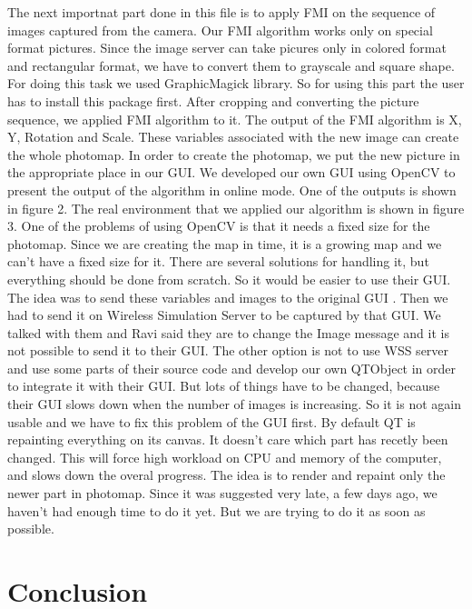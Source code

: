 \documentclass{article}
\begin{document}
The next importnat part done in this file is to apply FMI on the sequence of images captured from the camera. Our FMI algorithm works only on special format pictures. Since the image server can take picures only in colored format and rectangular format, we have to convert them to grayscale and square shape. For doing this task we used GraphicMagick library. So for using this part the user has to install this package first. After cropping and converting the picture sequence, we applied FMI algorithm to it. The output of the FMI algorithm is X, Y, Rotation and Scale. These variables associated with the new image can create the whole photomap. In order to create the photomap, we put the new picture in the appropriate place in our GUI. We developed our own GUI using OpenCV to present the output of the algorithm in online mode. One of the outputs is shown in figure 2. The real environment that we applied our algorithm is shown in figure 3. One of the problems of using OpenCV is that it needs a fixed size for the photomap. Since we are creating the map in time, it is a growing map and we can't have a fixed size for it. There are several solutions for handling it, but everything should be done from scratch. So it would be easier to use their GUI.\\

The idea was to send these variables and images to the original GUI . Then we had to send it on Wireless Simulation Server to be captured by that GUI. We talked with them and Ravi said they are to change the Image message and it is not possible to send it to their GUI. The other option is not to use WSS server and use some parts of their source code and develop our own QTObject in order to integrate it with their GUI. But lots of things have to be changed, because their GUI slows down when the number of images is increasing. So it is not again usable and we have to fix this problem of the GUI first. By default QT is repainting everything on its canvas. It doesn't care which part has recetly been changed. This will force high workload on CPU and memory of the computer, and slows down the overal progress. The idea is to render and repaint only the newer part in photomap. Since it was suggested very late, a few days ago, we haven't had enough time to do it yet. But we are trying to do it as soon as possible.\\

\section{Conclusion}
\end{document}
